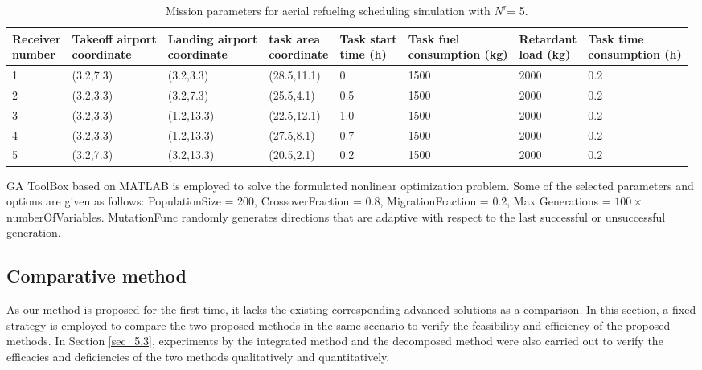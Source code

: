 \begin{table}
	\caption{Mission parameters for aerial refueling scheduling simulation with $N^\text{r}$= 5.}
	\begin{centering}
		\begin{tabular}{l|l|l|l|l|l|l|l}
			\hline 
			\tabincell{l}{Receiver\\number} 
			&\tabincell{l}{Takeoff airport\\coordinate}
			&\tabincell{l}{Landing airport\\coordinate}
			&\tabincell{l}{task area\\coordinate}
			&\tabincell{l}{Task start\\time (h)}
			&\tabincell{l}{Task fuel\\consumption (kg)}
			&\tabincell{l}{Retardant\\load (kg)}
			&\tabincell{l}{Task time\\consumption (h)}
			\tabularnewline
			\hline 
			1&(3.2,7.3)&(3.2,3.3)&(28.5,11.1)&0&1500&2000&0.2\tabularnewline
			2&(3.2,3.3)&(3.2,7.3)&(25.5,4.1)&0.5&1500&2000&0.2\tabularnewline
			3&(3.2,3.3)&(1.2,13.3)&(22.5,12.1)&1.0&1500&2000&0.2\tabularnewline
			4&(3.2,3.3)&(1.2,13.3)&(27.5,8.1)&0.7&1500&2000&0.2\tabularnewline
			5&(3.2,7.3)&(3.2,13.3)&(20.5,2.1)&0.2&1500&2000&0.2\tabularnewline                                                                        
			\hline 
		\end{tabular}
		\par\end{centering}
	\centering{}
	\label{Tab_15.4}
\end{table}

GA ToolBox based on MATLAB is employed to solve the formulated nonlinear optimization problem. Some of the selected parameters and options are given as follows: PopulationSize = 200, CrossoverFraction = 0.8, MigrationFraction = 0.2, Max Generations = $100\times$ numberOfVariables. MutationFunc randomly generates directions that are adaptive with respect to the last successful or unsuccessful generation.

\subsection{Comparative method}

As our method is proposed for the first time, it lacks the existing corresponding advanced solutions as a comparison. In this section, a fixed strategy is employed to compare the two proposed methods in the same scenario to verify the feasibility and efficiency of the proposed methods. In Section \ref{sec_5.3}, experiments by the integrated method and the decomposed method were also carried out to verify the efficacies and deficiencies of the two methods qualitatively and quantitatively.

